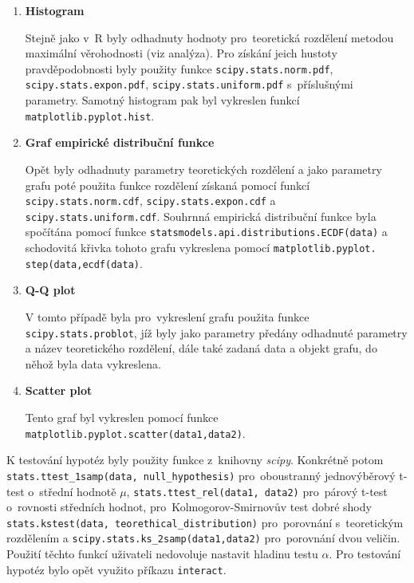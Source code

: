 \documentclass[thesis=B,czech]{FITthesis}[2012/06/26]
\begin{document}
\begin{enumerate}

\item \textbf{Histogram} \begin{sloppypar} Stejně jako v~R byly odhadnuty hodnoty pro~teoretická rozdělení metodou maximální věrohodnosti (viz analýza). Pro získání jeich hustoty pravděpodobnosti byly použity funkce \texttt{scipy.stats.norm.pdf}, \texttt{scipy.stats.expon.pdf}, \texttt{scipy.stats.uniform.pdf} s~příslušnými parametry. Samotný histogram pak byl vykreslen funkcí \texttt{matplotlib.pyplot.hist}.\end{sloppypar}

\item \textbf{Graf empirické distribuční funkce} \begin{sloppypar} Opět byly odhadnuty parametry teoretických rozdělení a jako parametry grafu poté použita funkce rozdělení získaná pomocí funkcí \texttt{scipy.stats.norm.cdf}, \texttt{scipy.stats.expon.cdf} a \texttt{scipy.stats.uniform.cdf}. Souhrnná empirická distribuční funkce byla spočítána pomocí funkce \texttt{statsmodels.api.distributions.ECDF(data)} a schodovitá křivka tohoto grafu vykreslena pomocí \texttt{matplotlib.pyplot.
step(data,ecdf(data)}. \end{sloppypar}

\item \textbf{Q-Q plot} \begin{sloppypar}V tomto případě byla pro~vykreslení grafu použita funkce \texttt{scipy.stats.problot}, jíž byly jako parametry předány odhadnuté parametry a název teoretického rozdělení, dále také zadaná data a objekt grafu, do něhož byla data vykreslena.\end{sloppypar}

\item \textbf{Scatter plot} \begin{sloppypar}Tento graf byl vykreslen pomocí funkce \texttt{matplotlib.pyplot.scatter(data1,data2)}.\end{sloppypar}

\end{enumerate}

\begin{sloppypar}
K testování hypotéz byly použity funkce z~knihovny \textit{scipy}. Konkrétně potom \texttt{stats.ttest\_1samp(data, null\_hypothesis)} pro~oboustranný jednovýběrový t-test o~střední hodnotě $\mu$, \texttt{stats.ttest\_rel(data1, data2)} pro~párový t-test o~rovnosti středních hodnot, pro~Kolmogorov-Smirnovův test dobré shody \texttt{stats.kstest(data, teorethical\_distribution)} pro~porovnání s~teoretickým rozdělením a \texttt{scipy.stats.ks\_2samp(data1,data2)} pro~porovnání dvou veličin. Použití těchto funkcí uživateli nedovoluje nastavit hladinu testu $\alpha$. Pro testování hypotéz bylo opět využito příkazu \texttt{interact}.  
\end{sloppypar}
\end{document}

